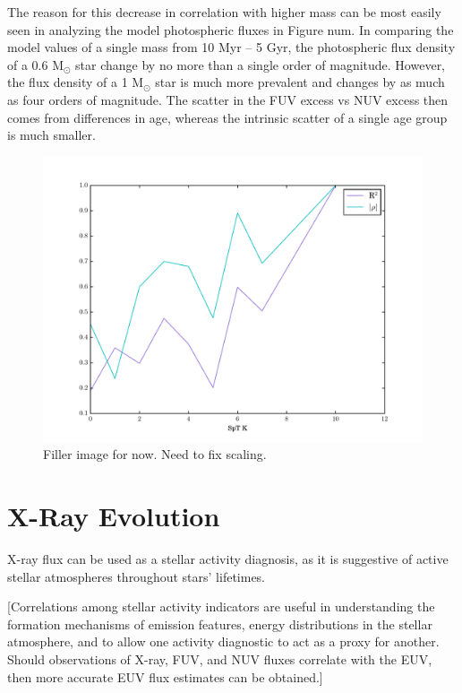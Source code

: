 \documentclass[twocolumn]{aastex62}
\begin{document}
The reason for this decrease in correlation with higher mass can be most easily seen in analyzing the model photospheric fluxes in Figure num. In comparing the model values of a single mass from 10 Myr -- 5 Gyr, the photospheric flux density of a 0.6 M$_{\odot}$ star change by no more than a single order of magnitude. However, the flux density of a 1 M$_{\odot}$ star is much more prevalent and changes by as much as four orders of magnitude. The scatter in the FUV excess vs NUV excess then comes from differences in age, whereas the intrinsic scatter of a single age group is much smaller. 


\begin{figure}[h]
\includegraphics[width=\linewidth]{R2_vs_spt.pdf}
\caption{Filler image for now. Need to fix scaling. \label{fig:r2_vs_spt}}
\end{figure}

\section{X-Ray Evolution}

X-ray flux can be used as a stellar activity diagnosis, as it is suggestive of active stellar atmospheres throughout stars’ lifetimes. 

[Correlations among stellar activity indicators are useful in understanding the formation mechanisms of emission features, energy distributions in the stellar atmosphere, and to allow one activity diagnostic to act as a proxy for another. Should observations of X-ray, FUV, and NUV fluxes correlate with the EUV, then more accurate EUV flux estimates can be obtained.]
\end{document}
